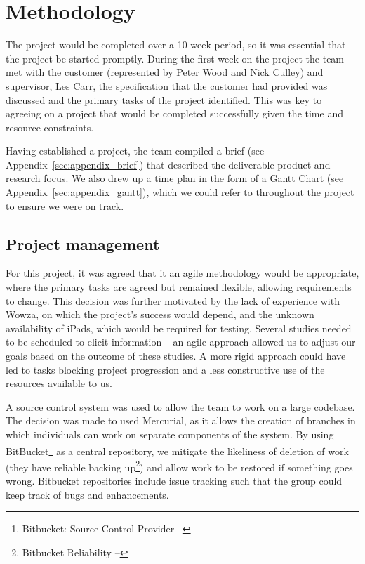 \section{Methodology}

The project would be completed over a 10 week period, so it was essential that the project be started promptly. During the first week on the project the team met with the customer (represented by Peter Wood and Nick Culley) and supervisor, Les Carr, the specification that the customer had provided was discussed and the primary tasks of the project identified. This was key to agreeing on a project that would be completed successfully given the time and resource constraints.

Having established a project, the team compiled a brief (see Appendix~\ref{sec:appendix_brief}) that described the deliverable product and research focus. We also drew up a time plan in the form of a Gantt Chart (see Appendix~\ref{sec:appendix_gantt}), which we could refer to throughout the project to ensure we were on track.

\subsection{Project management}

For this project, it was agreed that it an agile methodology would be appropriate, where the primary tasks are agreed but remained flexible, allowing requirements to change. This decision was further motivated by the lack of experience with Wowza, on which the project's success would depend, and the unknown availability of iPads, which would be required for testing. Several studies needed to be scheduled to elicit information -- an agile approach allowed us to adjust our goals based on the outcome of these studies. A more rigid approach could have led to tasks blocking project progression and a less constructive use of the resources available to us.

A source control system was used to allow the team to work on a large codebase. The decision was made to used Mercurial, as it allows the creation of branches in which individuals can work on separate components of the system. By using BitBucket\footnote{Bitbucket: Source Control Provider -- } as a central repository, we mitigate the likeliness of deletion of work (they have reliable backing up\footnote{Bitbucket Reliability -- }) and allow work to be restored if something goes wrong. Bitbucket repositories include issue tracking such that the group could keep track of bugs and enhancements.

